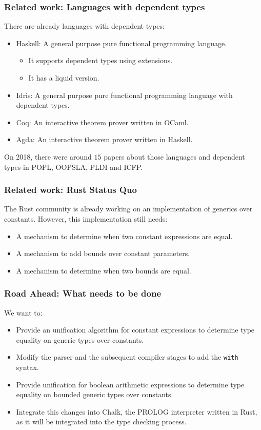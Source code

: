 \documentclass{beamer}
\newcommand{\code}[1] {\texttt{\footnotesize #1}}
\begin{document}
\begin{frame}[fragile]
    \frametitle{Related work: Languages with dependent types}
    There are already languages with dependent types:
    \begin{itemize}
        \item Haskell: A general purpose pure functional programming language.
            \begin{itemize}
                \item It supports dependent types using extensions.
                \item It has a liquid version.
            \end{itemize}
        \item Idris: A general purpose pure functional programming language with dependent types.
        \item Coq: An interactive theorem prover written in OCaml.
        \item Agda: An interactive theorem prover written in Haskell.
    \end{itemize}
    On 2018, there were around $15$ papers about those languages and dependent types in POPL, OOPSLA, PLDI and ICFP.
\end{frame}

\begin{frame}[fragile]
    \frametitle{Related work: Rust Status Quo}
    The Rust community is already working on an implementation of generics over constants. However, this implementation still needs:
    \begin{itemize}
        \item A mechanism to determine when two constant expressions are equal.
        \item A mechanism to add bounds over constant parameters.
        \item A mechanism to determine when two bounds are equal.
    \end{itemize}
\end{frame}

\begin{frame}[fragile]
    \frametitle{Road Ahead: What needs to be done}
    We want to:
    \begin{itemize}
        \item Provide an unification algorithm for constant expressions to determine type equality on generic types over constants.
        \item Modify the parser and the subsequent compiler stages to add the \code{with} syntax.
        \item Provide unification for boolean arithmetic expressions to determine type equality on bounded generic types over constants.
        \item Integrate this changes into Chalk, the PROLOG interpreter written in Rust, as it will be integrated into the type checking process.
    \end{itemize}
\end{frame}
\end{document}

